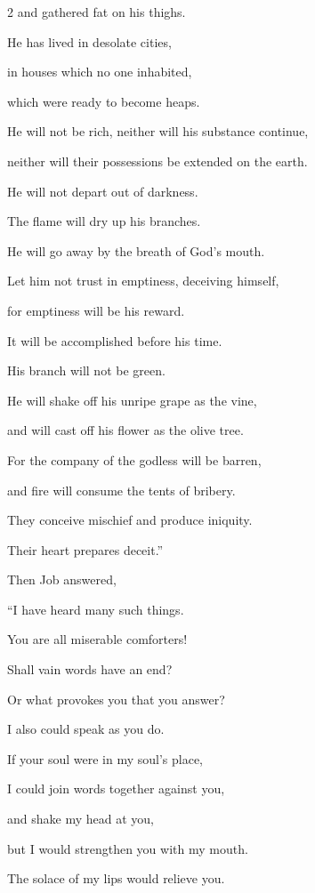 \begin{multicols}{2}
	and gathered fat on his thighs.
	
	\myverse{}He has lived in desolate cities,
	
	in houses which no one inhabited,
	
	which were ready to become heaps.
	
	\myverse{}He will not be rich, neither will his substance continue,
	
	neither will their possessions be extended on the earth.
	
	\myverse{}He will not depart out of darkness.
	
	The flame will dry up his branches.
	
	He will go away by the breath of God’s mouth.
	
	\myverse{}Let him not trust in emptiness, deceiving himself,
	
	for emptiness will be his reward.
	
	\myverse{}It will be accomplished before his time.
	
	His branch will not be green.
	
	\myverse{}He will shake off his unripe grape as the vine,
	
	and will cast off his flower as the olive tree.
	
	\myverse{}For the company of the godless will be barren,
	
	and fire will consume the tents of bribery.
	
	\myverse{}They conceive mischief and produce iniquity.
	
	Their heart prepares deceit.”
	
	
	
	\mychapter{} \myverse*{}Then Job answered,
	
	\quad\quad \myverse{}“I have heard many such things.
	
	You are all miserable comforters!
	
	\myverse{}Shall vain words have an end?
	
	Or what provokes you that you answer?
	
	\myverse{}I also could speak as you do.
	
	If your soul were in my soul’s place,
	
	I could join words together against you,
	
	and shake my head at you,
	
	\myverse{}but I would strengthen you with my mouth.
	
	The solace of my lips would relieve you.
	

\end{multicols}
